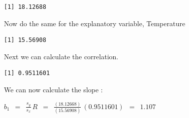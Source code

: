 \documentclass[
  letterpaper,
  DIV=11,
  numbers=noendperiod]{scrreprt}
\newenvironment{Shaded}{\begin{snugshade}}{\end{snugshade}}
\newcommand{\CommentTok}[1]{\textcolor[rgb]{0.37,0.37,0.37}{#1}}
\newcommand{\FunctionTok}[1]{\textcolor[rgb]{0.28,0.35,0.67}{#1}}
\newcommand{\NormalTok}[1]{\textcolor[rgb]{0.00,0.23,0.31}{#1}}
\newcommand{\OtherTok}[1]{\textcolor[rgb]{0.00,0.23,0.31}{#1}}
\newcommand{\SpecialCharTok}[1]{\textcolor[rgb]{0.37,0.37,0.37}{#1}}
\begin{document}
\begin{Shaded}
\end{Shaded}

\begin{verbatim}
[1] 18.12688
\end{verbatim}

Now do the same for the explanatory variable, Temperature

\begin{Shaded}
\end{Shaded}

\begin{verbatim}
[1] 15.56908
\end{verbatim}

Next we can calculate the correlation.

\begin{Shaded}
\end{Shaded}

\begin{verbatim}
[1] 0.9511601
\end{verbatim}

We can now calculate the slope :

\(\displaystyle{b_1\,\,\, = \,\,\,\frac{s_y}{s_x}\, R\,\,\, =
\,\,\,\frac{(18.12668)}{(15.56908)}\,(0.9511601)\,\,\, =\,\,\, 1.107 }\)
\end{document}
